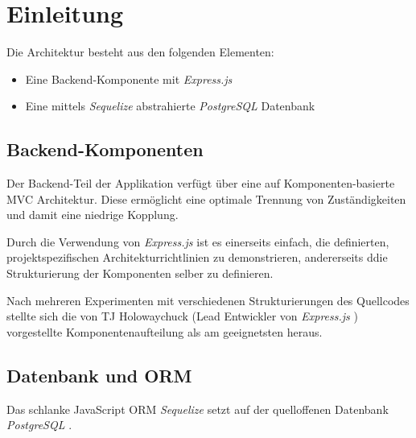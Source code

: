 \section{Einleitung}

Die Architektur besteht aus den folgenden Elementen:
\begin{itemize}
	\item Eine Backend-Komponente mit \emph{Express.js} \cite{Expressjs}
	\item Eine mittels \emph{Sequelize} \cite{Sequelize} abstrahierte
		\emph{PostgreSQL} \cite{PostgreSQL} Datenbank
\end{itemize}


\subsection{Backend-Komponenten}

Der Backend-Teil der Applikation verfügt über eine auf Komponenten-basierte
MVC Architektur. Diese ermöglicht eine optimale Trennung von Zuständigkeiten
\cite{SeparationOfConcerns} und damit eine niedrige Kopplung.

Durch die Verwendung von \emph{Express.js} \cite{Expressjs} ist es einerseits
einfach, die definierten, projektspezifischen Architekturrichtlinien zu
demonstrieren, andererseits ddie Strukturierung der Komponenten selber zu
definieren.

Nach mehreren Experimenten mit verschiedenen Strukturierungen des Quellcodes
stellte sich die von TJ Holowaychuck (Lead Entwickler von \emph{Express.js}
\cite{TJH}) vorgestellte Komponentenaufteilung  \cite{TJH_ComponentStructure}
als am geeignetsten heraus.




\subsection{Datenbank und ORM}

Das schlanke JavaScript \gls{ORM} \emph{Sequelize} \cite{Sequelize} setzt auf
der quelloffenen Datenbank \emph{PostgreSQL} \cite{PostgreSQL}.